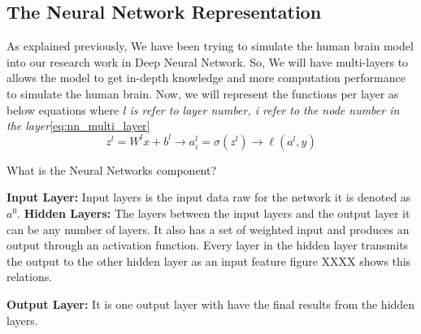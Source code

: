  \subsection{The Neural Network Representation}
 As explained previously, We have been trying to simulate the human brain model into our research work in Deep Neural Network. So, We will have multi-layers to allows the model to get in-depth knowledge and more computation performance to simulate the human brain.
 Now, we will represent the functions per layer as below equations where \textit{l is refer to layer number, i refer to the node number in the layer}\eqref{eq:nn_multi_layer}%
 \begin{equation}\label{eq:nn_multi_layer}
  \boxed{z^l =  W^l x + b^l} \longrightarrow \boxed{a_i^l =  \sigma(z^l)} \longrightarrow \boxed{\ell(a^l,y)}
\end{equation}

What is the Neural Networks component?

\textbf{Input Layer:} Input layers is the input data raw for the network it is denoted as $a^0$.
\textbf{Hidden Layers:} The layers between the input layers and the output layer it can be any number of layers. It also has a set of weighted input and produces an output through an activation function. Every layer in the hidden layer transmits the output to the other hidden layer as an input feature figure XXXX shows this relations. %

\textbf{Output Layer:} It is one output layer with have the final results from the hidden layers.

